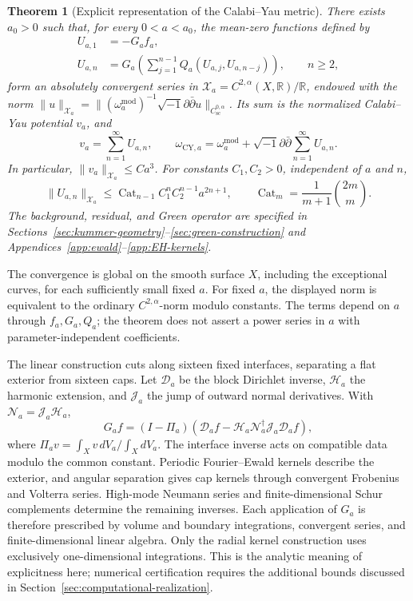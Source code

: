 \documentclass[11pt,a4paper,twoside]{article}
\numberwithin{equation}{section}
\newcommand{\ddc}{\sqrt{-1}\partial\bar\partial}
\newtheorem{theorem}{Theorem}[section]
\theoremstyle{definition}
\theoremstyle{remark}
\begin{document}
\begin{theorem}[Explicit representation of the Calabi--Yau metric]
\label{thm:main}
There exists \(a_0>0\) such that, for every \(0<a<a_0\), the
mean-zero functions defined by
\begin{equation}\label{eq:intro-recursion}
\begin{aligned}
U_{a,1}&=-G_af_a,\\
U_{a,n}&=G_a\!\left(\sum_{j=1}^{n-1}
Q_a(U_{a,j},U_{a,n-j})\right),\qquad n\ge2,
\end{aligned}
\end{equation}
form an absolutely convergent series in
\(\mathcal X_a=C^{2,\alpha}(X,\mathbb R)/\mathbb R\), endowed
with the norm
\(\|u\|_{\mathcal X_a}=\|(\omega_a^{\mathrm{mod}})^{-1}
\ddc u\|_{C_{\mathrm{sc}}^{0,\alpha}}\).
Its sum is the normalized Calabi--Yau potential \(v_a\), and
\begin{equation}\label{eq:main-metric}
v_a=\sum_{n=1}^{\infty}U_{a,n},
\qquad \omega_{\mathrm{CY},a}
=\omega_a^{\mathrm{mod}}+\ddc\sum_{n=1}^{\infty}U_{a,n}.
\end{equation}
In particular, \(\|v_a\|_{\mathcal X_a}\le Ca^3\). For constants
\(C_1,C_2>0\), independent of \(a\) and \(n\),
\[
\|U_{a,n}\|_{\mathcal X_a}
\le\operatorname{Cat}_{n-1}C_1^nC_2^{n-1}a^{2n+1},
\qquad \operatorname{Cat}_m=\frac1{m+1}\binom{2m}{m}.
\]
The background, residual, and Green operator are specified in
Sections~\ref{sec:kummer-geometry}--\ref{sec:green-construction}
and Appendices~\ref{app:ewald}--\ref{app:EH-kernels}.
\end{theorem}

The convergence is global on the smooth surface \(X\), including
the exceptional curves, for each sufficiently small fixed \(a\).
For fixed \(a\), the displayed norm is equivalent to the ordinary
\(C^{2,\alpha}\)-norm modulo constants. The terms depend on
\(a\) through \(f_a,G_a,Q_a\); the theorem does not assert a
power series in \(a\) with parameter-independent coefficients.

The linear construction cuts along sixteen fixed interfaces,
separating a flat exterior from sixteen caps. Let \(\mathcal D_a\)
be the block Dirichlet inverse, \(\mathcal H_a\) the harmonic
extension, and \(\mathcal J_a\) the jump of outward normal
derivatives. With \(\mathcal N_a=\mathcal J_a\mathcal H_a\),
\[
G_af=(I-\Pi_a)\left(\mathcal D_af
-\mathcal H_a\mathcal N_a^\dagger\mathcal J_a\mathcal D_af\right),
\]
where \(\Pi_av=\int_Xv\,dV_a/\int_XdV_a\). The interface
inverse acts on compatible data modulo the common constant.
Periodic Fourier--Ewald kernels describe the exterior, and angular
separation gives cap kernels through convergent Frobenius and
Volterra series. High-mode Neumann series and finite-dimensional
Schur complements determine the remaining inverses. Each
application of \(G_a\) is therefore prescribed by volume and
boundary integrations, convergent series, and finite-dimensional
linear algebra. Only the radial kernel construction uses exclusively
one-dimensional integrations. This is the analytic meaning of
explicitness here; numerical certification requires the additional
bounds discussed in Section~\ref{sec:computational-realization}.
\end{document}
